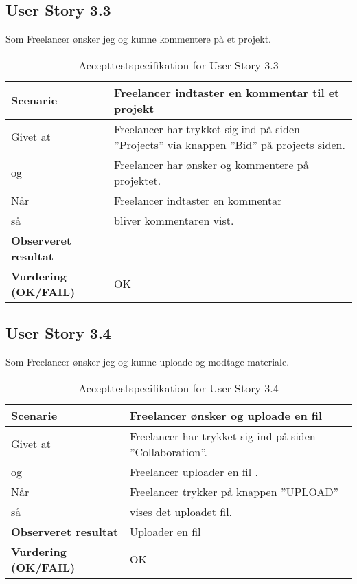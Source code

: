\subsection{User Story 3.3}
Som Freelancer ønsker jeg og kunne kommentere på et projekt.

\begin{table}[H]
	\centering
	\caption{Accepttestspecifikation for User Story 3.3 }
	\begin{tabular}{p{8cm}|p{8cm}}
		\hline
        \textbf{Scenarie} & Freelancer indtaster en kommentar til et projekt\\[10px]
		\hline
		Givet at & Freelancer har trykket sig ind på siden ''Projects'' via knappen ''Bid'' på projects siden.\\
        \hline
        og & Freelancer har ønsker og kommentere på projektet.\\
        \hline
        Når & Freelancer indtaster en kommentar\\
        \hline
        så & bliver kommentaren vist.\\
		\hline
		\rowcolor{white}
		\textbf{Observeret resultat} & \\
		\hline
		\textbf{Vurdering (OK/FAIL)} & OK\\
		\hline
	\end{tabular}
\end{table}

\subsection{User Story 3.4}
Som Freelancer ønsker jeg og kunne uploade og modtage materiale.

\begin{table}[H]
	\centering
	\caption{Accepttestspecifikation for User Story 3.4}
	\begin{tabular}{p{6cm}|p{6cm}}
		\hline
		\textbf{Scenarie} & Freelancer ønsker og uploade en fil\\[10px]
		\hline
		Givet at & Freelancer har trykket sig ind på siden ''Collaboration''.\\
        \hline
        og & Freelancer uploader en fil .\\
        \hline
        Når & Freelancer trykker på knappen ''UPLOAD''\\
        \hline
        så & vises det uploadet fil.\\
		\hline
		\rowcolor{white}
		\textbf{Observeret resultat} & Uploader en fil\\
		\hline
		\textbf{Vurdering (OK/FAIL)} & OK\\
		\hline
	\end{tabular}
\end{table}

